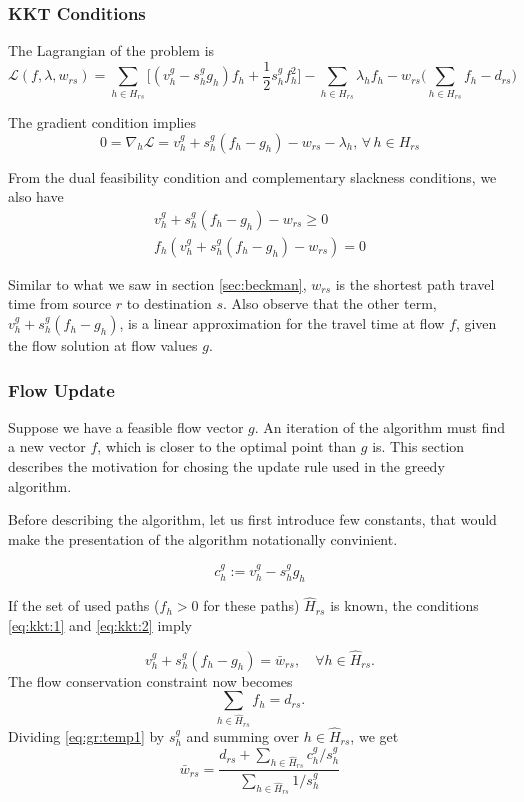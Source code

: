 \subsubsection*{KKT Conditions}
The Lagrangian of the problem is
\[
\mathcal{L}(f, \lambda, w_{rs}) =
\sum_{h\in H_{rs}}\big[(v_h^g - s_h^g g_h)f_h+
\frac{1}{2} s_h^g f_h^2\big]
-\sum_{h\in H_{rs}}\lambda_h f_h
-w_{rs}\Big(\sum_{h\in H_{rs}}f_h - d_{rs}\Big)
\]

The gradient condition implies
\[
0 = \nabla_h\mathcal{L} = v_h^g + s_h^g(f_h-g_h) - w_{rs}-\lambda_h,
\,\forall\, h\in H_{rs}
\]

From the dual feasibility condition and complementary slackness
conditions, we also have
\begin{align}
v_h^g + s_h^g(f_h-g_h) - w_{rs}\geq 0\label{eq:kkt:1}\\
f_h(v_h^g + s_h^g(f_h-g_h) - w_{rs}) = 0\label{eq:kkt:2}
\end{align}

Similar to what we saw in section \ref{sec:beckman}, $w_{rs}$ is the
shortest path travel time from source $r$ to destination $s$.
Also observe that the other term, $v_h^g + s_h^g(f_h-g_h)$,
is a linear approximation for the travel time at flow $f$,
given the flow solution at flow values $g$.


\subsubsection*{Flow Update}
Suppose we have a feasible flow vector $g$. An iteration
of the algorithm must find a new vector $f$, which is
closer to the optimal point than $g$ is. This section
describes the motivation for chosing the update rule used
in the greedy algorithm.

Before describing the algorithm, let us first introduce few
constants, that would make the presentation of the algorithm
notationally convinient.

\begin{equation}\label{eq:c}
	c_h^g := v^g_h - s_h^g g_h
\end{equation}

If the set of used paths ($f_h>0$ for these paths)
$\hat{H}_{rs}$ is known, the 
conditions \eqref{eq:kkt:1} and \eqref{eq:kkt:2} imply

\begin{equation}\label{eq:gr:temp1}
	v_h^g + s_h^g(f_h-g_h) = \bar{w}_{rs},\quad \forall h\in
	\hat{H}_{rs}.
\end{equation}
The flow conservation constraint now becomes
\begin{equation}\label{eq:gr:temp2}
	\sum_{h\in \hat{H}_{rs}} f_h = d_{rs}.
\end{equation}
Dividing \eqref{eq:gr:temp1} by $s_h^g$ and summing over
$h\in \hat{H}_{rs}$, we get
\begin{equation}\label{eq:w}
	\bar{w}_{rs} = \frac{d_{rs} + \sum_{h\in \hat{H}_{rs}}c_h^g/s_h^g}
	{\sum_{h\in \hat{H}_{rs}}1/s_h^g}
\end{equation}

